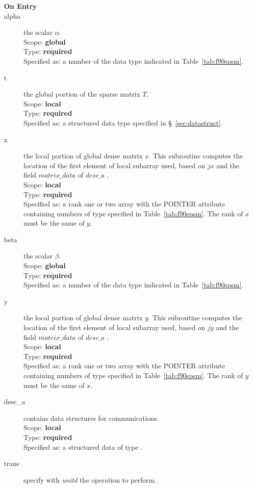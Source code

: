 \begin{description}
\item[\bf On Entry]
\item[alpha] the scalar $\alpha$.\\
Scope: {\bf global} \\
Type: {\bf required}\\
Specified as: a number of the data type indicated in
Table~\ref{tab:f90spsm}.
\item[t] the global portion of the sparse matrix
$T$.  \\ 
Scope: {\bf local} \\
Type: {\bf required}\\
Specified as: a structured data type specified in
\S~\ref{sec:datastruct}.
\item[x] the local portion of global dense matrix
$x$. This subroutine computes the location of the first element of
local subarray used, based on $jx$ and the field $matrix\_data$ of $desc\_a$ . \\
Scope: {\bf local} \\
Type: {\bf required} \\
Specified as:  a rank one or two array with the POINTER attribute
containing numbers of type specified in
Table~\ref{tab:f90spsm}.  The rank of $x$ must be the same of $y$. 
\item[beta] the scalar $\beta$.\\
Scope: {\bf global} \\
Type: {\bf required} \\
Specified as: a number of the data type indicated in Table~\ref{tab:f90spsm}.
\item[y] the local portion of global dense matrix
$y$. This subroutine computes the location of the first element of
local subarray used, based on $jy$ and the field $matrix\_data$ of $desc\_a$ . \\
Scope: {\bf local} \\
Type: {\bf required} \\
Specified as:  a rank one or two array with the POINTER attribute
containing numbers of type specified in
Table~\ref{tab:f90spsm}. The rank of $y$ must be the same of $x$. 
\item[desc\_a] contains data structures for communications.\\
Scope: {\bf local} \\
Type: {\bf required}\\
Specified as: a structured data of type \descdata.
\item[trans] specify with {\em unitd} the operation to perform.

\end{description}
